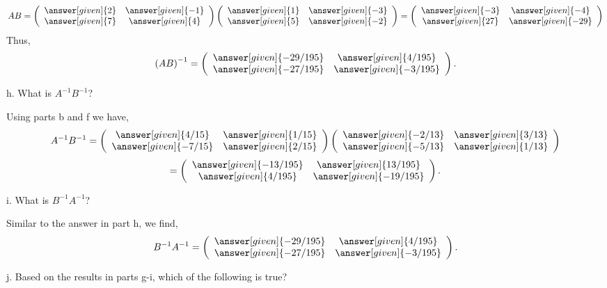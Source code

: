\documentclass{ximera}
\begin{document}
\begin{example}
\begin{prompt}
\[AB = \left(\begin{array}{cc}
  \answer[given]{2} &  \answer[given]{-1}  \\
   \answer[given]{7}&  \answer[given]{4}
\end{array}\right)\left(\begin{array}{cc}
  \answer[given]{1} &  \answer[given]{-3}  \\
   \answer[given]{5}&  \answer[given]{-2}
\end{array}\right)= \left(\begin{array}{cc}
  \answer[given]{-3} &  \answer[given]{-4}  \\
   \answer[given]{27}&  \answer[given]{-29}
\end{array}\right)  \]
Thus,
\[ \left(AB\right)^{-1} = \left(\begin{array}{cc}
  \answer[given]{-29/195} &  \answer[given]{4/195}  \\
   \answer[given]{-27/195}&  \answer[given]{-3/195}
\end{array}\right). \]
\end{prompt}

h. What is $A^{-1}B^{-1}$?

\begin{prompt}
Using parts b and f we have,
\[ A^{-1}B^{-1}= \left(\begin{array}{cc}
  \answer[given]{4/15} &  \answer[given]{1/15}  \\
   \answer[given]{-7/15}&  \answer[given]{2/15}
\end{array}\right)\left(\begin{array}{cc}
  \answer[given]{-2/13} &  \answer[given]{3/13}  \\
   \answer[given]{-5/13}&  \answer[given]{1/13}
\end{array}\right)
\]
\[= \left(\begin{array}{cc}
  \answer[given]{-13/195} &  \answer[given]{13/195}  \\
   \answer[given]{4/195}&  \answer[given]{-19/195}
\end{array}\right). \]
\end{prompt}

i. What is $B^{-1}A^{-1}$?

\begin{prompt}
Similar to the answer in part h, we find,
\[ B^{-1}A^{-1}= \left(\begin{array}{cc}
  \answer[given]{-29/195} &  \answer[given]{4/195}  \\
   \answer[given]{-27/195}&  \answer[given]{-3/195}
\end{array}\right).\]
\end{prompt}

j. Based on the results in parts g-i, which of the following is true?
\begin{multipleChoice}
\end{multipleChoice}
\end{example}
\end{document}
